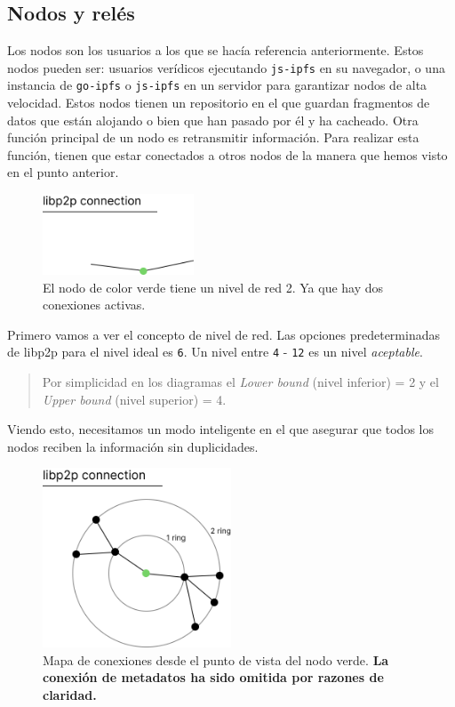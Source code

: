 \subsection{Nodos y relés}
Los nodos son los usuarios a los que se hacía referencia anteriormente. Estos nodos pueden ser: usuarios verídicos ejecutando \verb|js-ipfs| \cite{web:js-ipfs} en su navegador, o una instancia de \verb|go-ipfs| \cite{web:go-ipfs} o \verb|js-ipfs| en un servidor para garantizar nodos de alta velocidad.
Estos nodos tienen un repositorio en el que guardan fragmentos de datos que están alojando o bien que han pasado por él y ha cacheado.
Otra función principal de un nodo es retransmitir información. Para realizar esta función, tienen que estar conectados a otros nodos de la manera que hemos visto en el punto anterior.
\begin{figure}[H]
    \centering
    \includegraphics[width=0.4\textwidth]{Figures/Angulo 2.png}
    \caption{El nodo de color verde tiene un nivel de red 2. Ya que hay dos conexiones activas.}
    \label{fg:network_dgr}
\end{figure}
Primero vamos a ver el concepto de nivel de red. Las opciones predeterminadas de libp2p para el nivel ideal es \verb|6|. Un nivel entre \verb|4| - \verb|12| es un nivel \textit{aceptable}.
\begin{quote}
    Por simplicidad en los diagramas el \textit{Lower bound} (nivel inferior) = 2 y el \textit{Upper bound} (nivel superior) = 4.
\end{quote}
Viendo esto, necesitamos un modo inteligente en el que asegurar que todos los nodos reciben la información sin duplicidades.
\begin{figure}[h!]
        \centering
        \includegraphics[width=0.5\textwidth]{Figures/Radios de comunicacion.png}
        \caption{Mapa de conexiones desde el punto de vista del nodo verde. \textbf{La conexión de metadatos ha sido omitida por razones de claridad.}}
        \label{fg:Mapa_de_conexiones}
\end{figure}
